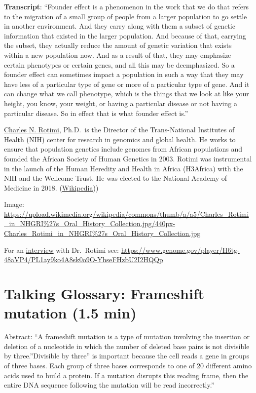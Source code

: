 \documentclass[
]{book}
\begin{document}
\textbf{Transcript}: ``Founder effect is a phenomenon in the work that we do that refers to the migration of a small group of people from a larger population to go settle in another environment. And they carry along with them a subset of genetic information that existed in the larger population. And because of that, carrying the subset, they actually reduce the amount of genetic variation that exists within a new population now. And as a result of that, they may emphasize certain phenotypes or certain genes, and all this may be deemphasized. So a founder effect can sometimes impact a population in such a way that they may have less of a particular type of gene or more of a particular type of gene. And it can change what we call phenotype, which is the things that we look at like your height, you know, your weight, or having a particular disease or not having a particular disease. So in effect that is what founder effect is.''

\href{https://en.wikipedia.org/wiki/Charles_Rotimi}{Charles N. Rotimi}, Ph.D.~is the Director of the Trans-National Institutes of Health (NIH) center for research in genomics and global health. He works to ensure that population genetics include genomes from African populations and founded the African Society of Human Genetics in 2003. Rotimi was instrumental in the launch of the Human Heredity and Health in Africa (H3Africa) with the NIH and the Wellcome Trust. He was elected to the National Academy of Medicine in 2018. (\href{https://en.wikipedia.org/wiki/Charles_Rotimi}{Wikipedia}))

Image: \url{https://upload.wikimedia.org/wikipedia/commons/thumb/a/a5/Charles_Rotimi_in_NHGRI\%27s_Oral_History_Collection.jpg/440px-Charles_Rotimi_in_NHGRI\%27s_Oral_History_Collection.jpg}

For an \href{https://www.genome.gov/player/H6tg-48aVP4/PL1ay9ko4A8sk0o9O-YhseFHzbU2I2HQQp}{interview} with Dr.~Rotimi see: \url{https://www.genome.gov/player/H6tg-48aVP4/PL1ay9ko4A8sk0o9O-YhseFHzbU2I2HQQp}

\hypertarget{talking-glossary-frameshift-mutation-1.5-min}{%
\section{Talking Glossary: Frameshift mutation (1.5 min)}\label{talking-glossary-frameshift-mutation-1.5-min}}

Abstract: ``A frameshift mutation is a type of mutation involving the insertion or deletion of a nucleotide in which the number of deleted base pairs is not divisible by three.''Divisible by three'' is important because the cell reads a gene in groups of three bases. Each group of three bases corresponds to one of 20 different amino acids used to build a protein. If a mutation disrupts this reading frame, then the entire DNA sequence following the mutation will be read incorrectly.''
\end{document}
